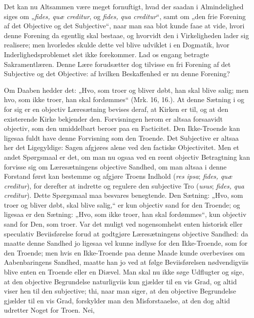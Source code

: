  Det kan nu Altsammen være meget fornuftigt, hvad der saadan i
Almindelighed siges om „\textit{fides, quæ creditur}, og
\textit{fides, qua creditur}“, samt om „den frie Forening af det
Objective og det Subjective“, naar man saa blot kunde faae at
vide, hvori denne Forening da egentlig skal bestaae, og hvorvidt
den i Virkeligheden lader sig realisere; men hvorledes skulde
dette vel blive udviklet i en Dogmatik, hvor Inderlighedsproblemet
slet ikke forekommer. Lad os engang betragte Sakramentlæren. Denne
Lære forudsætter dog tilvisse en fri Forening af det Subjective og
det Objective: af hvilken Beskaffenhed er nu denne Forening?

Om Daaben hedder det: „Hvo, som troer og bliver døbt, han skal
blive salig; men hvo, som ikke troer, han skal fordømmes“ (Mrk.
16, 16.). At denne Sætning i og for sig er en objectiv
Læresætning bevises deraf, at Kirken er til, og at den existerende
Kirke bekjender den. Forvisningen herom er altsaa forsaavidt
objectiv, som den umiddelbart beroer paa en Facticitet. Den
Ikke-Troende kan ligesaa fuldt have denne Forvisning som den
Troende. Det Subjective er altsaa her det Ligegyldige: Sagen
afgjøres alene ved den factiske Objectivitet. Men et andet
Spørgsmaal er det, om man nu ogsaa ved en reent objectiv
Betragtning kan forvisse sig om Læresætningens objective Sandhed,
om man altsaa i denne Forstand først kan bestemme og afgjøre
Troens Indhold (\textit{res ipsa}; \textit{fides, quæ creditur}),
for derefter at indrette og regulere den subjective
 Tro (\textit{usus}; \textit{fides, qua creditur}). Dette
Spørgsmaal maa besvares benegtende. Den Sætning: „Hvo, som troer
og bliver døbt, skal blive salig,“ er kun objectiv sand for den
Troende; og ligesaa er den Sætning: „Hvo, som ikke troer, han skal
fordømmes“, kun objectiv sand for Den, som troer. Var det muligt
ved nogensomhelst enten historisk eller speculativ Beviisførelse
forud at godtgjøre Læresætningens objective Sandhed: da maatte
denne Sandhed jo ligesaa vel kunne indlyse for den Ikke-Troende,
som for den Troende; men hvis en Ikke-Troende paa denne Maade
kunde overbevises om Aabenbaringens Sandhed, maatte han jo ved at
følge Beviisførelsen nødvendigviis blive enten en Troende eller en
Diævel. Man skal nu ikke søge Udflugter og sige, at den objective
Begrundelse naturligviis kun gjælder til en vis Grad, og altid
viser hen til den subjective; thi, naar man siger, at den
objective Begrundelse gjælder til en vis Grad, forskylder man den
Misforstaaelse, at den dog altid udretter Noget for Troen. Nei,
